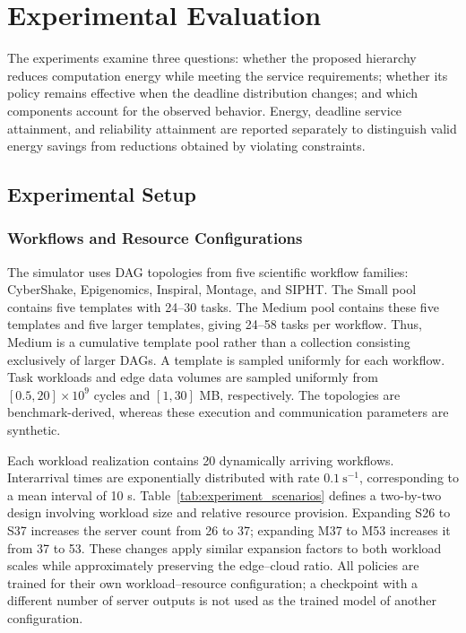 \section{Experimental Evaluation}
\label{sec:experiments}

The experiments examine three questions: whether the proposed hierarchy
reduces computation energy while meeting the service requirements;
whether its policy remains effective when the deadline distribution
changes; and which components account for the observed behavior.
Energy, deadline service attainment, and reliability attainment are
reported separately to distinguish valid energy savings from reductions
obtained by violating constraints.

\subsection{Experimental Setup}
\label{subsec:experiment_setup}

\subsubsection{Workflows and Resource Configurations}

The simulator uses DAG topologies from five scientific workflow families:
CyberShake, Epigenomics, Inspiral, Montage, and SIPHT. The Small pool
contains five templates with 24--30 tasks. The Medium pool contains these
five templates and five larger templates, giving 24--58 tasks per
workflow. Thus, Medium is a cumulative template pool rather than a
collection consisting exclusively of larger DAGs. A template is sampled
uniformly for each workflow. Task workloads and edge data volumes are
sampled uniformly from $[0.5,20]\times10^9$ cycles and $[1,30]$ MB,
respectively. The topologies are benchmark-derived, whereas these
execution and communication parameters are synthetic.

Each workload realization contains 20 dynamically arriving workflows.
Interarrival times are exponentially distributed with rate
$0.1\ \mathrm{s}^{-1}$, corresponding to a mean interval of 10 s.
Table~\ref{tab:experiment_scenarios} defines a two-by-two design involving
workload size and relative resource provision. Expanding S26 to S37
increases the server count from 26 to 37; expanding M37 to M53 increases
it from 37 to 53. These changes apply similar expansion factors to both
workload scales while approximately preserving the edge--cloud ratio.
All policies are trained for their own workload--resource configuration;
a checkpoint with a different number of server outputs is not used as
the trained model of another configuration.


